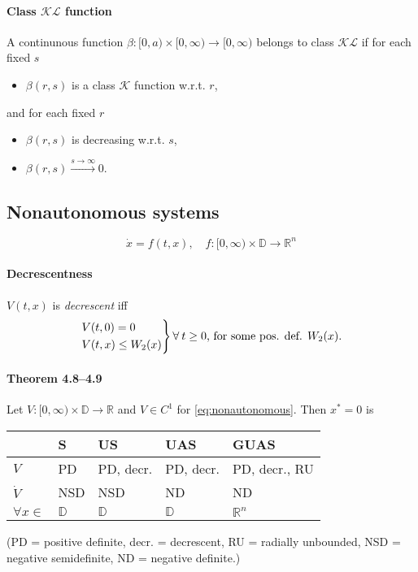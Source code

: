 \paragraph{Class $\mathcal{KL}$ function}
A continunous function $\beta : [0,a) \times [0,\infty) \to [0,\infty)$ belongs to class $\mathcal{KL}$ if for each fixed $s$
\begin{itemize}
	\item $\beta(r,s)$ is a class $\mathcal{K}$ function w.r.t. $r$,
\end{itemize}
and for each fixed $r$
\begin{itemize}
	\item $\beta(r,s)$ is decreasing w.r.t. $s$,
	\item $\beta(r,s) \xrightarrow{s \to \infty} 0$.
\end{itemize}

\subsection{Nonautonomous systems}
\begin{equation}\label{eq:nonautonomous}
	\dot{x} = f(t,x), \quad f : [0,\infty) \times \mathbb{D} \to \mathbb{R}^n
\end{equation}

\paragraph{Decrescentness}
$V(t,x)$ is \emph{decrescent} iff
\begin{equation}
	\begin{rcases}
		V(t,0) =    0      \\
		V(t,x) \leq W_2(x)
	\end{rcases}
	\forall \: t \geq 0
	\mbox{, for some pos. def. }
	W_2(x).
\end{equation}

\paragraph{Theorem 4.8--4.9}
Let $V : [0,\infty) \times \mathbb{D} \to \mathbb{R}$ and $V \in C^1$ for \eqref{eq:nonautonomous}. Then $x^* = 0$ is
\begin{center}
	\begin{tabular}{lllll}
		& S & US & UAS & GUAS \\
		\hline
		$V$ & PD & PD, decr. & PD, decr. & PD, decr., RU \\
		$\dot{V}$ & NSD & NSD & ND & ND \\
		$\forall x \in$ & $\mathbb{D}$ & $\mathbb{D}$ & $\mathbb{D}$ & $\mathbb{R}^n$
	\end{tabular}
\end{center}
(PD = positive definite, decr. = decrescent, RU = radially unbounded, NSD = negative semidefinite, ND = negative definite.)

